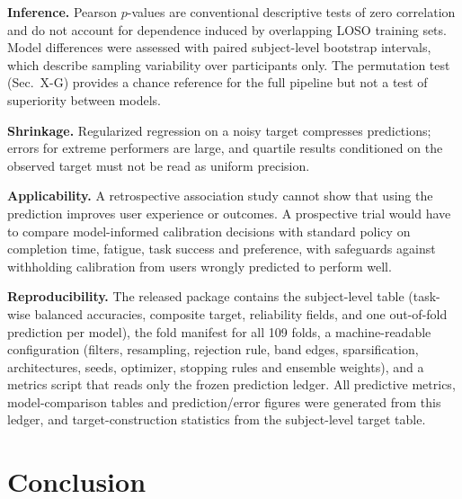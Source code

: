 \documentclass{ieeeaccess}
\begin{document}
\textbf{Inference.} Pearson $p$-values are conventional descriptive tests of zero correlation and do not account for dependence induced by overlapping LOSO training sets. Model differences were assessed with paired subject-level bootstrap intervals, which describe sampling variability over participants only. The permutation test (Sec.~X-G) provides a chance reference for the full pipeline but not a test of superiority between models.

\textbf{Shrinkage.} Regularized regression on a noisy target compresses predictions; errors for extreme performers are large, and quartile results conditioned on the observed target must not be read as uniform precision.

\textbf{Applicability.} A retrospective association study cannot show that using the prediction improves user experience or outcomes. A prospective trial would have to compare model-informed calibration decisions with standard policy on completion time, fatigue, task success and preference, with safeguards against withholding calibration from users wrongly predicted to perform well.

\textbf{Reproducibility.} The released package contains the subject-level table (task-wise balanced accuracies, composite target, reliability fields, and one out-of-fold prediction per model), the fold manifest for all 109 folds, a machine-readable configuration (filters, resampling, rejection rule, band edges, sparsification, architectures, seeds, optimizer, stopping rules and ensemble weights), and a metrics script that reads only the frozen prediction ledger. All predictive metrics, model-comparison tables and prediction/error figures were generated from this ledger, and target-construction statistics from the subject-level target table.

\section{Conclusion}
\end{document}
